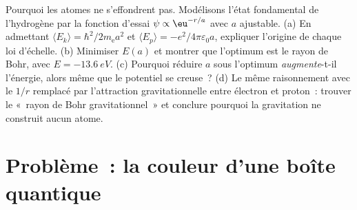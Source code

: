 \begin{exercise}[$\star\star\star$]\label{exo:b3:schrodinger-three-dimensions:12}
Pourquoi les atomes ne s'effondrent pas. Modélisons l'état fondamental
de l'hydrogène par la fonction d'essai $\psi \propto \eu^{-r/a}$ avec
$a$ ajustable. (a) En admettant $\langle E_k\rangle = \hbar^2/2m_{\text{e}}a^2$ et
$\langle E_p\rangle = -e^2/4\pi\varepsilon_0a$, expliquer l'origine de
chaque loi d'échelle. (b) Minimiser $E(a)$ et montrer que l'optimum est
le rayon de Bohr, avec $E = \qty{-13.6}{eV}$. (c) Pourquoi réduire $a$
sous l'optimum \emph{augmente}-t-il l'énergie, alors même que le
potentiel se creuse~? (d) Le même raisonnement avec le $1/r$ remplacé
par l'attraction gravitationnelle entre électron et proton~: trouver le
«~rayon de Bohr gravitationnel~» et conclure pourquoi la gravitation ne
construit aucun atome.
\end{exercise}

\section{Problème~: la couleur d'une boîte quantique}

